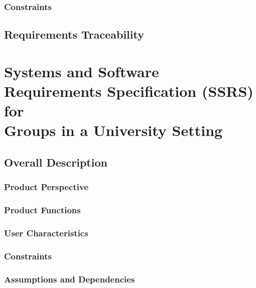 \documentclass[12pt, oneside, letterpaper]{report}
\begin{document}
	\section{Constraints}
		

%		

\chapter{Requirements Traceability}
		

\part{Systems and Software Requirements Specification (SSRS) \\ for \\ Groups in a University Setting}
\chapter{Overall Description}
	\section{Product Perspective}
		
	\section{Product Functions}
		
	\section{User Characteristics}
		
	\section{Constraints}
		
	\section{Assumptions and Dependencies}
		
\end{document}
